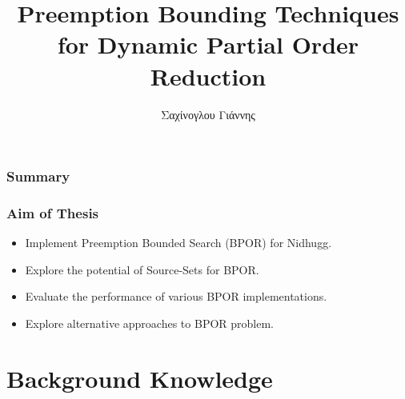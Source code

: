 \documentclass[9pt]{beamer}
\title[Short title]{Preemption Bounding Techniques for Dynamic Partial Order Reduction} %
\author{Σαχίνογλου Γιάννης} %
\institute[NTUA] %
{
ΣΗΜΜΥ - ΕΜΠ \\ %
\medskip
\textit{03112089} %
}
\date{} %
\begin{document}
\begin{frame}
\titlepage %
\end{frame}

\begin{frame}
\frametitle{Summary} %
\tableofcontents %
\end{frame}




\begin{frame}
\frametitle{Aim of Thesis}
\begin{itemize}[<+->]
    \item Implement Preemption Bounded Search (BPOR) for Nidhugg. 
    \item Explore the potential of Source-Sets for BPOR.
    \item Evaluate the performance of various BPOR implementations.
    \item Explore alternative approaches to BPOR problem.
\end{itemize}

\end{frame}

\section{Background Knowledge}
\end{document}
